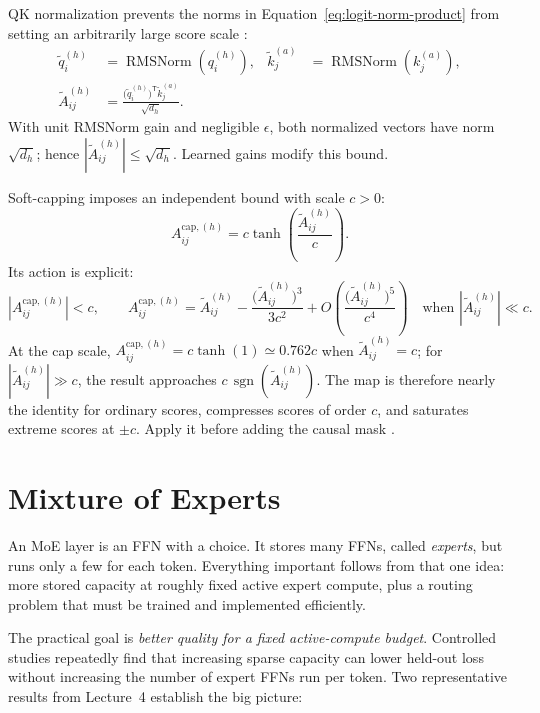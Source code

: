 \documentclass[11pt]{article}
\newcommand{\RMSNorm}{\operatorname{RMSNorm}}
\begin{document}
QK normalization prevents the norms in Equation~\eqref{eq:logit-norm-product}
from setting an arbitrarily large score scale
\citep{dehghani2023vit22b,wortsman2023instabilities}:
\begin{align}
  \widetilde q_i^{(h)}
  &=\RMSNorm\!\left(q_i^{(h)}\right),
  &\widetilde k_j^{(a)}
  &=\RMSNorm\!\left(k_j^{(a)}\right),\\
  \widetilde A_{ij}^{(h)}
  &=\frac{\bigl(\widetilde q_i^{(h)}\bigr)^{\mathsf T}
          \widetilde k_j^{(a)}}{\sqrt{d_h}}.
\end{align}
With unit RMSNorm gain and negligible $\epsilon$, both normalized vectors have
norm $\sqrt{d_h}$; hence
$|\widetilde A_{ij}^{(h)}|\leq\sqrt{d_h}$.  Learned gains modify this bound.

Soft-capping imposes an independent bound with scale $c>0$:
\begin{equation}
  A_{ij}^{\mathrm{cap},(h)}
  =c\tanh\!\left(\frac{\widetilde A_{ij}^{(h)}}{c}\right).
  \label{eq:attention-soft-cap}
\end{equation}
Its action is explicit:
\[
  \left|A_{ij}^{\mathrm{cap},(h)}\right|<c,
  \qquad
  A_{ij}^{\mathrm{cap},(h)}
  =\widetilde A_{ij}^{(h)}
   -\frac{\bigl(\widetilde A_{ij}^{(h)}\bigr)^3}{3c^2}
   +O\!\left(\frac{\bigl(\widetilde A_{ij}^{(h)}\bigr)^5}{c^4}\right)
  \quad\text{when }|\widetilde A_{ij}^{(h)}|\ll c.
\]
At the cap scale,
$A_{ij}^{\mathrm{cap},(h)}=c\tanh(1)\simeq0.762c$ when
$\widetilde A_{ij}^{(h)}=c$; for
$|\widetilde A_{ij}^{(h)}|\gg c$, the result approaches
$c\,\operatorname{sgn}(\widetilde A_{ij}^{(h)})$.  The map is therefore nearly
the identity for ordinary scores, compresses scores of order $c$, and saturates
extreme scores at $\pm c$.  Apply it before adding the causal mask
\citep{hashimoto2026architecture}.

\newpage
\section{Mixture of Experts}

An MoE layer is an FFN with a choice.  It stores many FFNs, called
\emph{experts}, but runs only a few for each token.  Everything important follows
from that one idea: more stored capacity at roughly fixed active expert compute,
plus a routing problem that must be trained and implemented efficiently.

The practical goal is \emph{better quality for a fixed active-compute budget}.
Controlled studies repeatedly find that increasing sparse capacity can lower
held-out loss without increasing the number of expert FFNs run per token.  Two
representative results from Lecture~4 establish the big picture:
\end{document}
